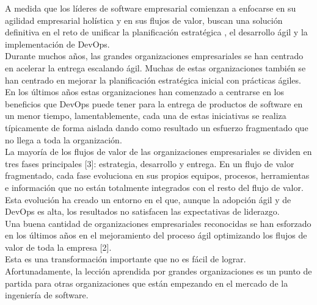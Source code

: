 \begin{multicols}{2}
A medida que los líderes de software empresarial comienzan a enfocarse en su agilidad empresarial holística y en sus flujos de valor, buscan una solución definitiva en el reto de unificar la planificación estratégica , el desarrollo ágil y la implementación de DevOps.\\

Durante muchos años, las grandes organizaciones empresariales se han centrado en acelerar la entrega escalando ágil. Muchas de estas organizaciones también se han centrado en mejorar la planificación estratégica inicial con prácticas ágiles. En los últimos años estas organizaciones han comenzado a centrarse en los beneficios que DevOps puede tener para la entrega de productos de software en un menor tiempo, lamentablemente, cada una de estas iniciativas se realiza típicamente de forma aislada dando como resultado un esfuerzo fragmentado que no llega a toda la organización.\\

La mayoría de los flujos de valor de las organizaciones empresariales se dividen en tres fases principales [3]: estrategia, desarrollo y entrega. En un flujo de valor fragmentado, cada fase evoluciona en sus propios equipos, procesos, herramientas e información que no están totalmente integrados con el resto del flujo de valor. Esta evolución ha creado un entorno en el que, aunque la adopción ágil y de DevOps es alta, los resultados no satisfacen las expectativas de liderazgo.\\

Una buena cantidad de organizaciones empresariales reconocidas se han esforzado en los últimos años en el mejoramiento del proceso ágil optimizando los flujos de valor de toda la empresa [2].\\

Esta es una transformación importante que no es fácil de lograr. Afortunadamente, la lección aprendida por grandes organizaciones es un punto de partida para otras organizaciones que están empezando en el mercado de la ingeniería de software.\\





\end{multicols}

